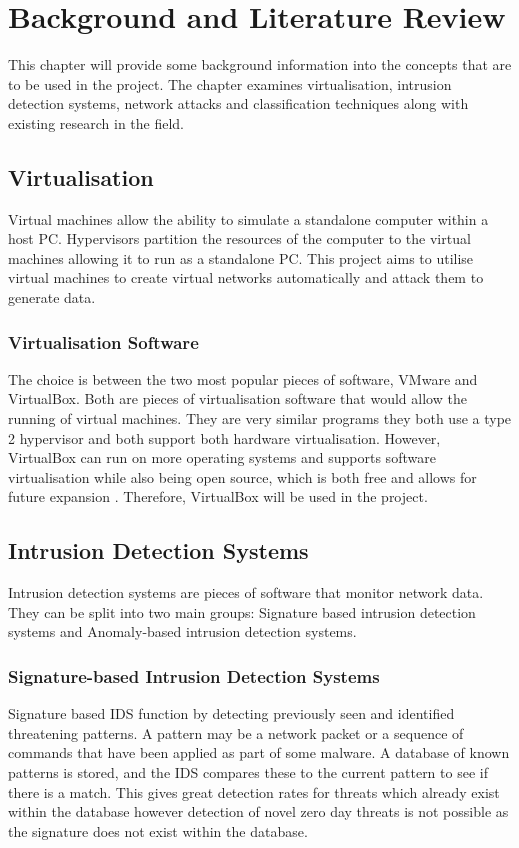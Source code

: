\chapter{Background and Literature Review}
This chapter will provide some background information into the concepts that are to be used in the project. The chapter examines virtualisation, intrusion detection systems, network attacks and classification techniques along with existing research in the field.

\section{Virtualisation}
Virtual machines allow the ability to simulate a standalone computer within a host PC. Hypervisors partition the resources of the computer to the virtual machines allowing it to run as a standalone PC. This project aims to utilise virtual machines to create virtual networks automatically and attack them to generate data.

\subsection{Virtualisation Software}
The choice is between the two most popular pieces of software, VMware and VirtualBox. Both are pieces of virtualisation software that would allow the running of virtual machines. They are very similar programs they both use a type 2 hypervisor and both support both hardware virtualisation\cite{vvv}. However, VirtualBox can run on more operating systems and supports software virtualisation while also being open source, which is both free and allows for future expansion \cite{vvv}. Therefore, VirtualBox will be used in the project.

\section{Intrusion Detection Systems}
Intrusion detection systems are pieces of software that monitor network data. They can be split into two main groups: Signature based intrusion detection systems and Anomaly-based intrusion detection systems. 

\subsection{Signature-based Intrusion Detection Systems}
Signature based IDS function by detecting previously seen and identified threatening patterns. A pattern may be a network packet or a sequence of commands that have been applied as part of some malware. A database of known patterns is stored, and the IDS compares these to the current pattern to see if there is a match. This gives great detection rates for threats which already exist within the database \cite{Khraisat2019} however detection of novel zero day threats is not possible as the signature does not exist within the database. 


